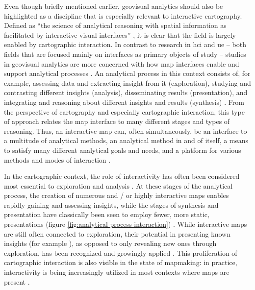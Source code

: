 Even though briefly mentioned earlier,
geovisual analytics should also be highlighted as
a discipline that is especially relevant to interactive cartography.
Defined as \enquote{the science of analytical reasoning with
spatial information as facilitated by interactive visual interfaces}
\parencite{rob2017b},
it is clear that the field is largely enabled by
cartographic interaction.
In contrast to research in \acrshort{hci} and \acrshort{ue} --
both fields that are focused mainly on interfaces as primary objects of study
\parencite{mol2023, car1997} --
studies in geovisual analytics are more concerned with
how map interfaces enable and support analytical processes \parencite{rob2017b, and2010}.
An analytical process in this context consists of, for example,
assessing data and extracting insight from it (exploration),
studying and contrasting different insights (analysis),
disseminating results (presentation),
and integrating and reasoning about different insights and results (synthesis) \parencite{mac2017, dib1990}.
From the perspective of cartography and especially cartographic interaction,
this type of approach relates the map interface to many different stages and types of reasoning.
Thus, an interactive map can, often simultaneously, be
an interface to a multitude of analytical methods,
an analytical method in and of itself,
a means to satisfy many different analytical goals and needs,
and a platform for various methods and modes of interaction \parencite{rot2013b, rot2015}.

In the cartographic context,
the role of interactivity has often been considered most essential to
exploration and analysis \parencite{eds2008}.
At these stages of the analytical process,
the creation of numerous and / or highly interactive maps
enables rapidly gaining and assessing insights,
while the stages of synthesis and presentation
have classically been seen to employ fewer,
more static, presentations
(figure \ref{fig:analytical process interaction}) \parencite{dib1990}.
While interactive maps are still often connected to exploration,
their potential in presenting known insights (for example \textcite{ecc2008}),
as opposed to only revealing new ones through exploration,
has been recognized and growingly applied \parencite{fis2021}.
This proliferation of cartographic interaction is also visible in the state of mapmaking:
in practice, interactivity is being increasingly utilized
in most contexts where maps are present \parencite{fis2021, mei2019, rot2015}.

